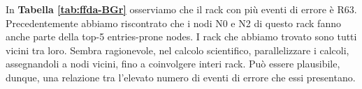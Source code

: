 		In \textbf{Tabella \ref{tab:ffda-BGr}} osserviamo che il rack con più eventi di errore è R63. Precedentemente abbiamo riscontrato che i nodi N0 e N2 di questo rack fanno anche parte della top-5 entries-prone nodes. I rack che abbiamo trovato sono tutti vicini tra loro. Sembra ragionevole, nel calcolo scientifico, parallelizzare i calcoli, assegnandoli a nodi vicini, fino a coinvolgere interi rack. Può essere plausibile, dunque, una relazione tra l'elevato numero di eventi di errore che essi presentano.